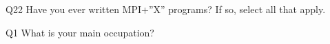 \begin{description}%
\item{Q22} Have you ever written MPI+”X” programs? If so, select all that apply.%
\item{Q1} What is your main occupation?%
\end{description}%
